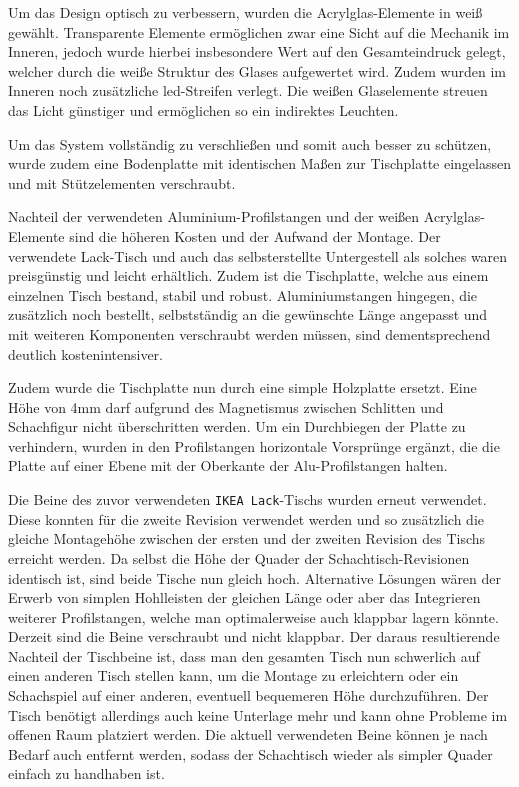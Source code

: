 Um das Design optisch zu verbessern, wurden die Acrylglas-Elemente in
weiß gewählt. Transparente Elemente ermöglichen zwar eine Sicht auf die
Mechanik im Inneren, jedoch wurde hierbei insbesondere Wert auf den
Gesamteindruck gelegt, welcher durch die weiße Struktur des Glases
aufgewertet wird. Zudem wurden im Inneren noch zusätzliche
\gls{led}-Streifen verlegt. Die weißen Glaselemente streuen das Licht
günstiger und ermöglichen so ein indirektes Leuchten.

Um das System vollständig zu verschließen und somit auch besser zu
schützen, wurde zudem eine Bodenplatte mit identischen Maßen zur
Tischplatte eingelassen und mit Stützelementen verschraubt.

Nachteil der verwendeten Aluminium-Profilstangen und der weißen
Acrylglas-Elemente sind die höheren Kosten und der Aufwand der Montage.
Der verwendete Lack-Tisch und auch das selbsterstellte Untergestell als
solches waren preisgünstig und leicht erhältlich. Zudem ist die
Tischplatte, welche aus einem einzelnen Tisch bestand, stabil und
robust. Aluminiumstangen hingegen, die zusätzlich noch bestellt,
selbstständig an die gewünschte Länge angepasst und mit weiteren
Komponenten verschraubt werden müssen, sind dementsprechend deutlich
kostenintensiver.

Zudem wurde die Tischplatte nun durch eine simple Holzplatte ersetzt.
Eine Höhe von 4mm darf aufgrund des Magnetismus zwischen Schlitten und
Schachfigur nicht überschritten werden. Um ein Durchbiegen der Platte zu
verhindern, wurden in den Profilstangen horizontale Vorsprünge ergänzt,
die die Platte auf einer Ebene mit der Oberkante der Alu-Profilstangen
halten.

Die Beine des zuvor verwendeten
\passthrough{\lstinline!IKEA Lack!}-Tischs wurden erneut verwendet.
Diese konnten für die zweite Revision verwendet werden und so zusätzlich
die gleiche Montagehöhe zwischen der ersten und der zweiten Revision des
Tischs erreicht werden. Da selbst die Höhe der Quader der
Schachtisch-Revisionen identisch ist, sind beide Tische nun gleich hoch.
Alternative Lösungen wären der Erwerb von simplen Hohlleisten der
gleichen Länge oder aber das Integrieren weiterer Profilstangen, welche
man optimalerweise auch klappbar lagern könnte. Derzeit sind die Beine
verschraubt und nicht klappbar. Der daraus resultierende Nachteil der
Tischbeine ist, dass man den gesamten Tisch nun schwerlich auf einen
anderen Tisch stellen kann, um die Montage zu erleichtern oder ein
Schachspiel auf einer anderen, eventuell bequemeren Höhe durchzuführen.
Der Tisch benötigt allerdings auch keine Unterlage mehr und kann ohne
Probleme im offenen Raum platziert werden. Die aktuell verwendeten Beine
können je nach Bedarf auch entfernt werden, sodass der Schachtisch
wieder als simpler Quader einfach zu handhaben ist.

